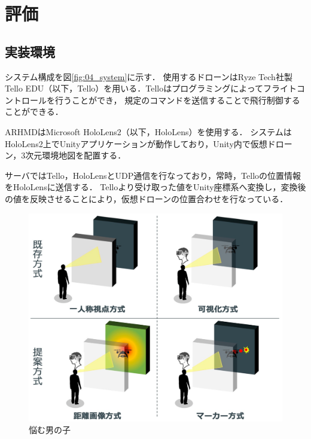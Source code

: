 \documentclass[a4paper,10pt,twocolumn,uplatex]{jsarticle}
\begin{document}
\section{評価}

\subsection{実装環境}
システム構成を図\ref{fig:04_system}に示す．
使用するドローンはRyze Tech社製Tello EDU（以下，Tello）を用いる．Telloはプログラミングによってフライトコントロールを行うことができ，
規定のコマンドを送信することで飛行制御することができる．
\par
ARHMDはMicrosoft HoloLens2（以下，HoloLens）を使用する．
システムはHoloLens2上でUnityアプリケーションが動作しており，Unity内で仮想ドローン，3次元環境地図を配置する．
\par
サーバではTello，HoloLensとUDP通信を行なっており，常時，Telloの位置情報をHoloLensに送信する．
Telloより受け取った値をUnity座標系へ変換し，変換後の値を反映させることにより，仮想ドローンの位置合わせを行なっている．
\par



\begin{figure}[!tb]
  \centering
  \includegraphics[width=\linewidth]{img/03_outline.eps}
  \caption{悩む男の子}
  \label{fig:sample1}
\end{figure}
  
\end{document}
